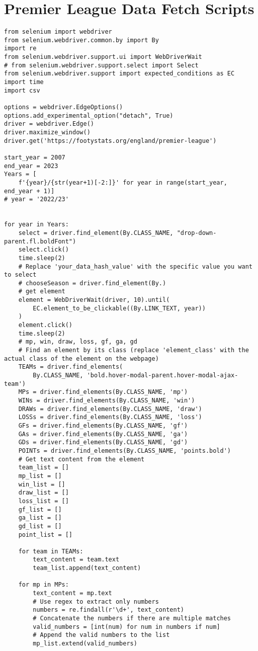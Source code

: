 \section{Premier League Data Fetch Scripts}\label{sec:GetData}
\begin{lstlisting}[style=pystyle]
from selenium import webdriver
from selenium.webdriver.common.by import By
import re
from selenium.webdriver.support.ui import WebDriverWait
# from selenium.webdriver.support.select import Select
from selenium.webdriver.support import expected_conditions as EC
import time
import csv

options = webdriver.EdgeOptions()
options.add_experimental_option("detach", True)
driver = webdriver.Edge()
driver.maximize_window()
driver.get('https://footystats.org/england/premier-league')

start_year = 2007
end_year = 2023
Years = [
    f'{year}/{str(year+1)[-2:]}' for year in range(start_year, end_year + 1)]
# year = '2022/23'


for year in Years:
    select = driver.find_element(By.CLASS_NAME, "drop-down-parent.fl.boldFont")
    select.click()
    time.sleep(2)
    # Replace 'your_data_hash_value' with the specific value you want to select
    # chooseSeason = driver.find_element(By.)
    # get element
    element = WebDriverWait(driver, 10).until(
        EC.element_to_be_clickable((By.LINK_TEXT, year))
    )
    element.click()
    time.sleep(2)
    # mp, win, draw, loss, gf, ga, gd
    # Find an element by its class (replace 'element_class' with the actual class of the element on the webpage)
    TEAMs = driver.find_elements(
        By.CLASS_NAME, 'bold.hover-modal-parent.hover-modal-ajax-team')
    MPs = driver.find_elements(By.CLASS_NAME, 'mp')
    WINs = driver.find_elements(By.CLASS_NAME, 'win')
    DRAWs = driver.find_elements(By.CLASS_NAME, 'draw')
    LOSSs = driver.find_elements(By.CLASS_NAME, 'loss')
    GFs = driver.find_elements(By.CLASS_NAME, 'gf')
    GAs = driver.find_elements(By.CLASS_NAME, 'ga')
    GDs = driver.find_elements(By.CLASS_NAME, 'gd')
    POINTs = driver.find_elements(By.CLASS_NAME, 'points.bold')
    # Get text content from the element
    team_list = []
    mp_list = []
    win_list = []
    draw_list = []
    loss_list = []
    gf_list = []
    ga_list = []
    gd_list = []
    point_list = []

    for team in TEAMs:
        text_content = team.text
        team_list.append(text_content)

    for mp in MPs:
        text_content = mp.text
        # Use regex to extract only numbers
        numbers = re.findall(r'\d+', text_content)
        # Concatenate the numbers if there are multiple matches
        valid_numbers = [int(num) for num in numbers if num]
        # Append the valid numbers to the list
        mp_list.extend(valid_numbers)


\end{lstlisting}
